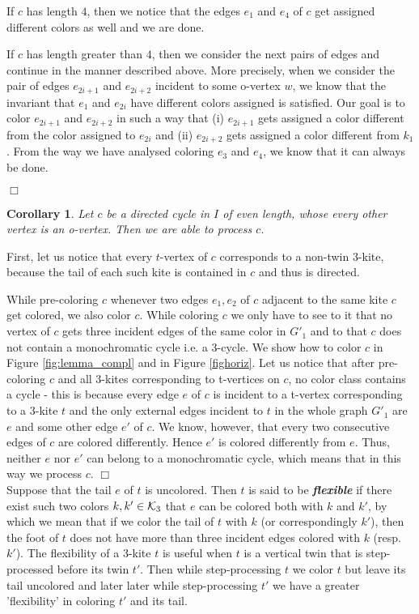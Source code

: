 \documentclass[a4, 11pt]{article}
\newcommand{\dowod}{\noindent{\bf Proof.~}}
\newcommand{\koniec}{\hfill $\Box$\\[.1ex]}
\newcommand{\<}{\langle}
\renewcommand{\>}{\rangle}
\newcommand{\Kt}{{\cal K}_3}
\newtheorem{corollary}{Corollary}
\begin{document}
If $c$ has length $4$, then we notice that the edges $e_1$ and $e_4$  of $c$ get assigned different colors as well and we are done.

If $c$ has length greater than $4$, then we consider the next pairs of edges and continue in the manner described above.  More precisely, when we consider the pair of edges $e_{2i+1}$ and $e_{2i+2}$ incident to some o-vertex $w$,
we know that the invariant that $e_1$ and $e_{2i}$ have different colors assigned is satisfied. Our goal is to color $e_{2i+1}$ and $e_{2i+2}$ in such a way that (i) $e_{2i+1}$ gets assigned a color different from the color assigned to $e_{2i}$ and (ii) $e_{2i+2}$ gets assigned a color different from $k_1$. From the way we have analysed coloring $e_3$ and $e_4$, we know that it can always be done.
 
\koniec 

\begin{corollary} \label{cyklparz}
Let $c$ be a  directed cycle in $I$ of even length,   whose every other vertex is an o-vertex. Then we are able to process  $c$.
\end{corollary}
\dowod First, let us notice that every $t$-vertex of $c$ corresponds to a non-twin $3$-kite, because the tail of each such kite is contained in $c$ and thus is directed. 

While pre-coloring $c$ whenever two edges $e_1, e_2$ of $c$ adjacent to the same kite $c$ get colored, we also color $c$.
While coloring $c$ we only have to see to it that no vertex of $c$ gets three incident edges of the same color in $G'_1$ and to that $c$ does not contain a monochromatic cycle i.e. a $3$-cycle. We show how to color $c$ in Figure \ref{fig:lemma_compl} and in Figure \ref{fighoriz}.
 Let us notice that after pre-coloring 
$c$ and all $3$-kites corresponding to t-vertices on $c$, no color class contains a cycle - this is because every edge $e$ of $c$ is incident to a t-vertex corresponding to a $3$-kite $t$ and the only external edges incident to $t$ in the whole graph $G'_1$ are $e$ and some other edge $e'$ of $c$. We know, however, that every two consecutive edges of $c$ are colored differently. Hence $e'$ is colored differently from $e$. Thus, neither $e$ nor $e'$ can belong to a monochromatic cycle, which means that  in this way we process $c$.
\koniec


Suppose that the tail $e$ of $t$ is uncolored. Then $t$ is said to be {\bf \em flexible} if there exist such two colors $k,k' \in \Kt$ that $e$ can be colored both with  $k$ and $k'$, by which we mean that if we color the tail of $t$ with $k$ (or correspondingly $k'$), then the foot of $t$ does not have more than three incident edges colored with $k$ (resp. $k'$). The flexibility of a $3$-kite $t$ is useful when $t$ is a vertical twin that is step-processed before its twin $t'$. Then while step-processing $t$ we color $t$ but leave its tail uncolored and later later while step-processing $t'$ we have a greater 'flexibility' in coloring $t'$ and its tail.
\end{document}
